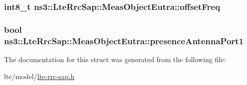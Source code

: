 \subsubsection[{\texorpdfstring{offset\+Freq}{offsetFreq}}]{\setlength{\rightskip}{0pt plus 5cm}int8\+\_\+t ns3\+::\+Lte\+Rrc\+Sap\+::\+Meas\+Object\+Eutra\+::offset\+Freq}\hypertarget{structns3_1_1LteRrcSap_1_1MeasObjectEutra_a1f43d106d31a740df47e09dfddb8ad46}{}\label{structns3_1_1LteRrcSap_1_1MeasObjectEutra_a1f43d106d31a740df47e09dfddb8ad46}
\subsubsection[{\texorpdfstring{presence\+Antenna\+Port1}{presenceAntennaPort1}}]{\setlength{\rightskip}{0pt plus 5cm}bool ns3\+::\+Lte\+Rrc\+Sap\+::\+Meas\+Object\+Eutra\+::presence\+Antenna\+Port1}\hypertarget{structns3_1_1LteRrcSap_1_1MeasObjectEutra_aa038635f78449611f6227ca043910dec}{}\label{structns3_1_1LteRrcSap_1_1MeasObjectEutra_aa038635f78449611f6227ca043910dec}


The documentation for this struct was generated from the following file\+:\begin{DoxyCompactItemize}
\item 
lte/model/\hyperlink{lte-rrc-sap_8h}{lte-\/rrc-\/sap.\+h}\end{DoxyCompactItemize}
